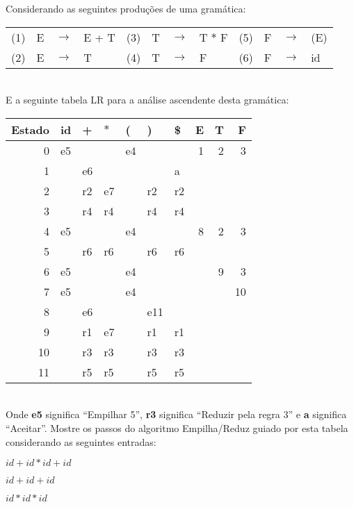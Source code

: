 \documentclass{compiladores}
\begin{document}
\begin{listanumerada}
\item Considerando as seguintes produções de uma gramática: \\
  \begin{tabularx}{\linewidth}{clclclclclcl}
    (1)& E  & $\rightarrow$ & E + T  & (3)& T & $\rightarrow$ & T $*$ F  & (5)&  F  & $\rightarrow$ & (E) \\
    (2)& E  & $\rightarrow$ & T      & (4)& T & $\rightarrow$ & F      & (6)& F  & $\rightarrow$ & id \\
  \end{tabularx} \\
  E a seguinte tabela LR para a análise ascendente desta gramática: \\
  \begin{tabular}{rllllll|rrr}
    \hline
    Estado  &  id  &  +   &  $*$  &  (   &  )    &  \$  &  E  &  T  &   F  \\
    \hline
    0  &  e5  &      &       &  e4  &       &      &  1  &  2  &   3  \\
    1  &      &  e6  &       &      &       &  a   &     &     &      \\
    2  &      &  r2  &  e7   &      &  r2   &  r2  &     &     &      \\
    3  &      &  r4  &  r4   &      &  r4   &  r4  &     &     &      \\
    4  &  e5  &      &       &  e4  &       &      &  8  &  2  &   3  \\
    5  &      &  r6  &  r6   &      &  r6   &  r6  &     &     &      \\
    6  &  e5  &      &       &  e4  &       &      &     &  9  &   3  \\
    7  &  e5  &      &       &  e4  &       &      &     &     &  10  \\
    8  &      &  e6  &       &      &  e11  &      &     &     &      \\
    9  &      &  r1  &  e7   &      &  r1   &  r1  &     &     &      \\
    10  &      &  r3  &  r3   &      &  r3   &  r3  &     &     &      \\
    11  &      &  r5  &  r5   &      &  r5   &  r5  &     &     &      \\\hline
  \end{tabular} \\
  Onde {\bf e5} significa ``Empilhar 5'', {\bf r3} significa ``Reduzir
  pela regra 3'' e {\bf a} significa ``Aceitar''. Mostre os passos do
  algoritmo Empilha/Reduz guiado por esta tabela considerando as
  seguintes entradas:
  \begin{lista}
  \item $id+id*id+id$
  \item $id+id+id$
  \item $id*id*id$
  \end{lista}
\end{listanumerada}
\end{document}
